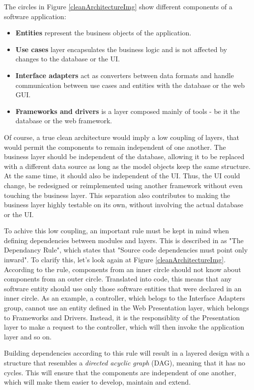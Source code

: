 The circles in Figure \ref{cleanArchitectureImg} show different components of a software application:

\begin{itemize}
    \item \textbf{Entities} represent the business objects of the application.
    \item \textbf{Use cases} layer encapsulates the business logic and is not affected by changes to the database or the UI.
    \item \textbf{Interface adapters} act as converters between data formats and handle communication between use cases and entities with the database or the web GUI.
    \item \textbf{Frameworks and drivers} is a layer composed mainly of tools - be it the database or the web framework.
\end{itemize}

Of course, a true clean architecture would imply a low coupling of layers, that would permit the components to remain independent of one another. The business layer should be independent of the database, allowing it to be replaced with a different data source as long as the model objects keep the same structure. At the same time, it should also be independent of the UI. Thus, the UI could change, be redesigned or reimplemented using another framework without even touching the business layer. This separation also contributes to making the business layer highly testable on its own, without involving the actual database or the UI.

To achive this low coupling, an important rule must be kept in mind when defining dependencies between modules and layers. This is described in \cite{cleanArchitecture} as "The Dependancy Rule", which states that "Source code dependencies must point only inward". To clarify this, let's look again at Figure \ref{cleanArchitectureImg}. According to the rule, components from an inner circle should not know about components from an outer circle. Translated into code, this means that any software entity should use only those software entities that were declared in an inner circle. As an example, a controller, which belogs to the Interface Adapters group, cannot use an entity defined in the Web Presentation layer, which belongs to Frameworks and Drivers. Instead, it is the responsiblity of the Presentation layer to make a request to the controller, which will then invoke the application layer and so on.

Building dependencies according to this rule will result in a layered design with a structure that resembles a \textit{directed acyclic graph} (DAG), meaning that it has no cycles. This will ensure that the components are independent of one another, which will make them easier to develop, maintain and extend.





